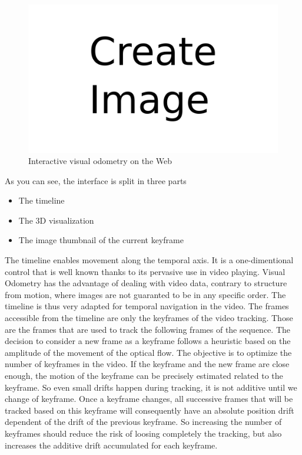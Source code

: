 \begin{figure}[h]
	\centering
	\includegraphics[width=\linewidth]{assets/img/todo.png}
	\caption{Interactive visual odometry on the Web}%
	\label{fig:interactive_vors}
\end{figure}

As you can see, the interface is split in three parts

\begin{itemize}
	\item The timeline
	\item The 3D visualization
	\item The image thumbnail of the current keyframe
\end{itemize}

The timeline enables movement along the temporal axis.
It is a one-dimentional control that is well known thanks to its pervasive use in video playing.
Visual Odometry has the advantage of dealing with video data,
contrary to structure from motion, where images are not guaranted to be in any specific order.
The timeline is thus very adapted for temporal navigation in the video.
The frames accessible from the timeline are only the keyframes of the video tracking.
Those are the frames that are used to track the following frames of the sequence.
The decision to consider a new frame as a keyframe follows a heuristic based on
the amplitude of the movement of the optical flow.
The objective is to optimize the number of keyframes in the video.
If the keyframe and the new frame are close enough,
the motion of the keyframe can be precisely estimated related to the keyframe.
So even small drifts happen during tracking, it is not additive until we change of keyframe.
Once a keyframe changes, all successive frames that will be tracked based on this keyframe
will consequently have an absolute position drift dependent of the drift of the previous keyframe.
So increasing the number of keyframes should reduce the risk of loosing completely the tracking,
but also increases the additive drift accumulated for each keyframe.


